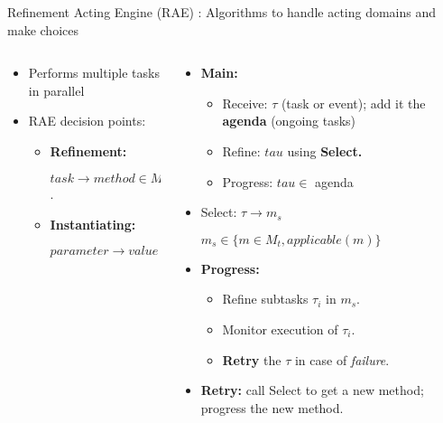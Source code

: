 \begin{frame}{Refinement Acting Engine (RAE) : Algorithms to handle acting domains and make choices}
\begin{columns}
    \begin{column}{0.35\textwidth}
    \pause
    \setlength{\leftmargini}{-1pt}
    \begin{itemize}
        \item Performs multiple tasks in parallel
        \pause
        \item RAE decision points:
        \begin{itemize}
            \pause
            \item \textbf{Refinement:}
            
            $task \rightarrow  method \in M_t$.
            \pause
            \item \textbf{Instantiating:}
            
            $parameter \rightarrow value \in D_p$
        \end{itemize}
    \end{itemize}
    \end{column}
    \begin{column}{0.65\textwidth}
        \begin{itemize}
            \setlength{\leftmargini}{-1pt}
            \item \textbf{Main:} 
            \begin{itemize}
                \item Receive:  $\tau$ (task or event);
                add it the \textbf{agenda} ({ongoing tasks})
                \pause
                \item Refine: $tau$ using \textbf{Select.}
                \pause
                \item Progress: $tau \in$ agenda
            \end{itemize}
            \pause
            \item Select: $\tau \rightarrow m_s$
            
            $ m_s \in \{m \in M_t, applicable(m)\}$
            \pause
            \item \textbf{Progress:}
                \begin{itemize}
                \item Refine subtasks $\tau_i$ in $m_s$.    
                \item Monitor execution of $\tau_i$.
                \item \textbf{Retry} the $\tau$ in case of \emph{failure}.
                \end{itemize}
                \pause
            
            \item \textbf{Retry:} call Select to get a new method; progress the new method.
        \end{itemize}
    \end{column}
\end{columns}

    
\end{frame}
